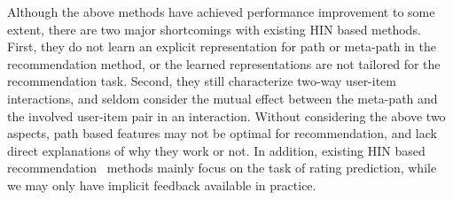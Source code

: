 

Although the above methods have achieved performance improvement to some extent,
there are two major shortcomings with existing HIN based methods.
First, they do not learn an explicit representation for path or meta-path in the recommendation method, or the learned representations are not tailored for the recommendation task.  %
Second, they still characterize two-way user-item interactions,  and seldom consider the mutual effect between the meta-path and the involved user-item pair in an interaction.
Without considering the above two aspects, path based features  may not be optimal for  recommendation, and lack direct explanations of why they work or not.
In addition,  existing HIN based recommendation~\cite{shi2017heterogeneous,zhao2017meta} methods mainly focus on the task of rating prediction, while we may only have  implicit feedback available  in practice.



